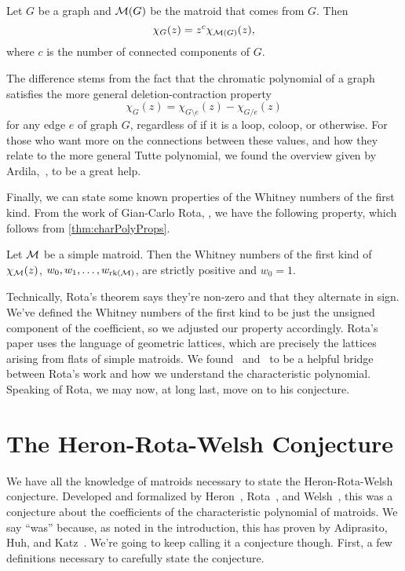 \documentclass[12pt,oneside]{../../sfsuthesis}
\begin{document}
\begin{proposition}
    Let \( G \) be a graph and \( \mathcal{M}(G) \) be the matroid that comes from \( G \).
    Then
    \[
        \chi_G(z) = z^c \chi_{\mathcal{M}(G)}(z),
    \]
    where \( c \) is the number of connected components of \( G \).
\end{proposition}

The difference stems from the fact that the chromatic polynomial of a graph satisfies the more general deletion-contraction property
\[
    \chi_G(z) = \chi_{G \setminus e}(z) - \chi_{G / e}(z)
\]
for any edge \( e \) of graph \( G \), regardless of if it is a loop, coloop, or otherwise.
For those who want more on the connections between these values, and how they relate to the more general Tutte polynomial, we found the overview given by Ardila,~\cite{ardilaTuttePolynomialsHyperplane2022}, to be a great help.

Finally, we can state some known properties of the Whitney numbers of the first kind.
From the work of Gian-Carlo Rota, \cite[Theorem~4]{rotaFoundationsCombinatorialTheory1964}, we have the following property, which follows from \th\ref{thm:charPolyProps}.
\begin{proposition}\th\label{thm:whitneyPositive}
    Let \( \mathcal{M} \) be a simple matroid.
    Then the Whitney numbers of the first kind of \( \chi_{\mathcal{M}}(z) \), \( w_0, w_1, \dots, w_{\operatorname{rk}(\mathcal{M})} \), are strictly positive and \( w_0 = 1 \).
\end{proposition}
Technically, Rota's theorem says they're non-zero and that they alternate in sign.
We've defined the Whitney numbers of the first kind to be just the unsigned component of the coefficient, so we adjusted our property accordingly.
Rota's paper uses the language of geometric lattices, which are precisely the lattices arising from flats of simple matroids.
We found~\cite{zaslavskyMobiusFunctionCharacteristic1987} and~\cite{aignerWhitneyNumbers1987} to be a helpful bridge between Rota's work and how we understand the characteristic polynomial.
Speaking of Rota, we may now, at long last, move on to his conjecture.

\section{The Heron-Rota-Welsh Conjecture}

We have all the knowledge of matroids necessary to state the Heron-Rota-Welsh conjecture.
Developed and formalized by Heron~\cite{heronMatroidPolynomials1972}, Rota~\cite{rotaCombinatorialTheoryOld1970}, and Welsh~\cite{welshMatroidTheory1976}, this was a conjecture about the coefficients of the characteristic polynomial of matroids.
We say ``was'' because, as noted in the introduction, this has proven by Adiprasito, Huh, and Katz~\cite{adiprasitoHodgeTheoryCombinatorial2018}.
We're going to keep calling it a conjecture though.
First, a few definitions necessary to carefully state the conjecture.
\end{document}
